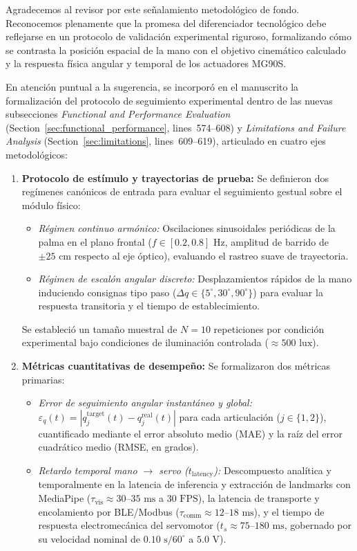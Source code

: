 \documentclass{LabDSTresponse}
\begin{document}
{Agradecemos al revisor por este señalamiento metodológico de fondo. Reconocemos plenamente que la promesa del diferenciador tecnológico debe reflejarse en un protocolo de validación experimental riguroso, formalizando cómo se contrasta la posición espacial de la mano con el objetivo cinemático calculado y la respuesta física angular y temporal de los actuadores MG90S.

En atención puntual a la sugerencia, se incorporó en el manuscrito la formalización del protocolo de seguimiento experimental dentro de las nuevas subsecciones \textit{Functional and Performance Evaluation} (Section~\ref{sec:functional_performance}, lines~574--608) y \textit{Limitations and Failure Analysis} (Section~\ref{sec:limitations}, lines~609--619), articulado en cuatro ejes metodológicos:

\begin{enumerate}
    \item \textbf{Protocolo de estímulo y trayectorias de prueba:}
    Se definieron dos regímenes canónicos de entrada para evaluar el seguimiento gestual sobre el módulo físico:
    \begin{itemize}
        \item \textit{Régimen continuo armónico:} Oscilaciones sinusoidales periódicas de la palma en el plano frontal ($f \in [0.2, 0.8]\text{ Hz}$, amplitud de barrido de $\pm 25\text{ cm}$ respecto al eje óptico), evaluando el rastreo suave de trayectoria.
        \item \textit{Régimen de escalón angular discreto:} Desplazamientos rápidos de la mano induciendo consignas tipo paso ($\Delta q \in \{5^\circ, 30^\circ, 90^\circ\}$) para evaluar la respuesta transitoria y el tiempo de establecimiento.
    \end{itemize}
    Se estableció un tamaño muestral de $N = 10$ repeticiones por condición experimental bajo condiciones de iluminación controlada ($\approx 500\text{ lux}$).

    \item \textbf{Métricas cuantitativas de desempeño:}
    Se formalizaron dos métricas primarias:
    \begin{itemize}
        \item \textit{Error de seguimiento angular instantáneo y global:} $\varepsilon_q(t) = |q_j^{\text{target}}(t) - q_j^{\text{real}}(t)|$ para cada articulación ($j \in \{1, 2\}$), cuantificado mediante el error absoluto medio (MAE) y la raíz del error cuadrático medio (RMSE, en grados).
        \item \textit{Retardo temporal mano $\to$ servo ($t_{\text{latency}}$):} Descompuesto analítica y temporalmente en la latencia de inferencia y extracción de landmarks con MediaPipe ($\tau_{\text{vis}} \approx 30\text{--}35\text{ ms}$ a $30\text{ FPS}$), la latencia de transporte y encolamiento por BLE/Modbus ($\tau_{\text{comm}} \approx 12\text{--}18\text{ ms}$), y el tiempo de respuesta electromecánica del servomotor ($t_s \approx 75\text{--}180\text{ ms}$, gobernado por su velocidad nominal de $0.10\text{ s}/60^\circ$ a $5.0\text{ V}$).
    \end{itemize}


\end{enumerate}}
\end{document}
